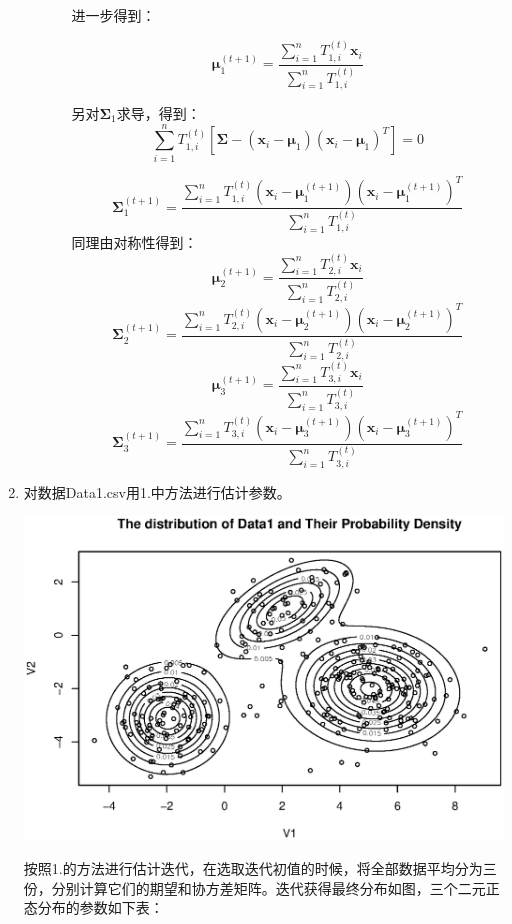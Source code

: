 \documentclass{ctexart}
\begin{document}
\begin{enumerate}
\begin{enumerate}
\begin{enumerate}
进一步得到：

\[
\bm{\mu}_1^{(t+1)}= \frac{ \displaystyle \sum_{i=1}^n T_{1,i}^{(t)} \bm{x}_i  }{\displaystyle \sum_{i=1}^n T_{1,i}^{(t)}}\]

另对\(\bm{\Sigma}_1\)求导，得到：
\[
\sum_{i=1}^n T_{1,i}^{(t)} [ \bm{\Sigma} -(\bm{x}_i-\bm{\mu}_1)(\bm{x}_i-\bm{\mu}_1)^T ] =0\]

\[
\bm{\Sigma}_1^{(t+1)}=\frac{\displaystyle \sum_{i=1}^n T_{1,i}^{(t)} (\bm{x}_i-\bm{\mu}_1^{(t+1)})(\bm{x}_i-\bm{\mu}_1^{(t+1)})^T}{\displaystyle \sum_{i=1}^n T_{1,i}^{(t)}}\]
同理由对称性得到：
\[
\bm{\mu}_2^{(t+1)}= \frac{ \displaystyle \sum_{i=1}^n T_{2,i}^{(t)} \bm{x}_i  }{\displaystyle \sum_{i=1}^n T_{2,i}^{(t)}}\]
\[
\bm{\Sigma}_2^{(t+1)}=\frac{\displaystyle \sum_{i=1}^n T_{2,i}^{(t)} (\bm{x}_i-\bm{\mu}_2^{(t+1)})(\bm{x}_i-\bm{\mu}_2^{(t+1)})^T}{\displaystyle \sum_{i=1}^n T_{2,i}^{(t)}}\]
\[
\bm{\mu}_3^{(t+1)}= \frac{ \displaystyle \sum_{i=1}^n T_{3,i}^{(t)} \bm{x}_i  }{\displaystyle \sum_{i=1}^n T_{3,i}^{(t)}}\]
\[
\bm{\Sigma}_3^{(t+1)}=\frac{\displaystyle \sum_{i=1}^n T_{3,i}^{(t)} (\bm{x}_i-\bm{\mu}_3^{(t+1)})(\bm{x}_i-\bm{\mu}_3^{(t+1)})^T}{\displaystyle \sum_{i=1}^n T_{3,i}^{(t)}}\]

\end{enumerate}

\end{enumerate}

\item
对数据Data1.csv用1.中方法进行估计参数。

\centerline{\includegraphics[width=5.5in]{2.eps}}

按照1.的方法进行估计迭代，在选取迭代初值的时候，将全部数据平均分为三份，分别计算它们的期望和协方差矩阵。迭代获得最终分布如图，三个二元正态分布的参数如下表：


\end{enumerate}
\end{document}
